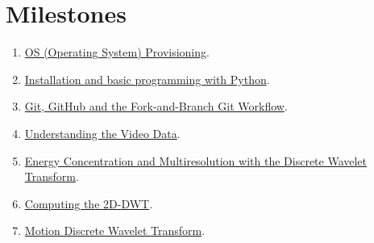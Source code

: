 \section{Milestones}
\begin{enumerate}
\item \href{https://sistemas-multimedia.github.io/study_guide/01-provisioning/}{OS (Operating System) Provisioning}.
\item \href{https://sistemas-multimedia.github.io/study_guide/02-python/}{Installation and basic programming with Python}.
\item \href{https://sistemas-multimedia.github.io/study_guide/03-git/}{Git, GitHub and the Fork-and-Branch Git Workflow}.
\item \href{https://sistemas-multimedia.github.io/study_guide/04-the_data/}{Understanding the Video Data}.
\item \href{https://sistemas-multimedia.github.io/study_guide/05-DWT/}{Energy Concentration and Multiresolution with the Discrete Wavelet Transform}.
\item \href{https://sistemas-multimedia.github.io/study_guide/06-2D-DWT/}{Computing the 2D-DWT}.
\item \href{https://sistemas-multimedia.github.io/study_guide/07-MDWT/}{Motion Discrete Wavelet Transform}.
\end{enumerate}

